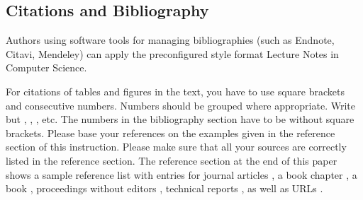 \subsection{Citations and Bibliography}
Authors using software tools for managing bibliographies (such as Endnote, Citavi, Mendeley) can apply the preconfigured style format Lecture Notes in Computer Science.



For citations of tables and figures in the text, you have to use square brackets and consecutive numbers. 
Numbers should be grouped where appropriate. 
Write \cite{smith1981identification,may2006zib,foster1999grid,czajkowski2001grid,foster2002physiology} 
but \citep{smith1981identification}, \citep{foster1999grid}, \citep{foster2002physiology}, etc. 
The numbers in the bibliography section have to be without square brackets. 
Please base your references on the examples given in the reference section of this instruction. 
Please make sure that all your sources are correctly listed in the reference section.
The reference section at the end of this paper shows a sample reference list with entries for journal articles \citep{smith1981identification}, 
a book chapter \citep{may2006zib}, 
a book \citep{foster1999grid}, 
proceedings without editors \citep{czajkowski2001grid}, 
technical reports \citep{foster2002physiology}, 
as well as URLs \citep{ncb}. 